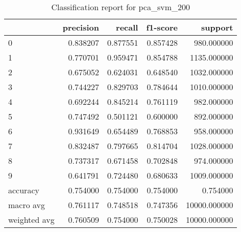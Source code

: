 \begin{table}[htb!]
\centering
\caption{Classification report for pca_svm_200}
\label{tab:classification-report-pca_svm_200}
\begin{tabular}{lrrrr}
\toprule
 & precision & recall & f1-score & support \\
\midrule
0 & 0.838207 & 0.877551 & 0.857428 & 980.000000 \\
1 & 0.770701 & 0.959471 & 0.854788 & 1135.000000 \\
2 & 0.675052 & 0.624031 & 0.648540 & 1032.000000 \\
3 & 0.744227 & 0.829703 & 0.784644 & 1010.000000 \\
4 & 0.692244 & 0.845214 & 0.761119 & 982.000000 \\
5 & 0.747492 & 0.501121 & 0.600000 & 892.000000 \\
6 & 0.931649 & 0.654489 & 0.768853 & 958.000000 \\
7 & 0.832487 & 0.797665 & 0.814704 & 1028.000000 \\
8 & 0.737317 & 0.671458 & 0.702848 & 974.000000 \\
9 & 0.641791 & 0.724480 & 0.680633 & 1009.000000 \\
accuracy & 0.754000 & 0.754000 & 0.754000 & 0.754000 \\
macro avg & 0.761117 & 0.748518 & 0.747356 & 10000.000000 \\
weighted avg & 0.760509 & 0.754000 & 0.750028 & 10000.000000 \\
\bottomrule
\end{tabular}
\end{table}
